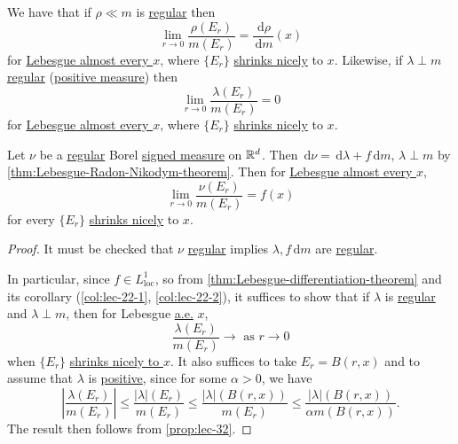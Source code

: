 \begin{prev}
	We have that if \(\rho \ll m\) is \hyperref[def:regular]{regular} then
	\[
		\lim_{r \to 0} \frac{\rho(E_r)}{m(E_r)} = \frac{\,\mathrm{d}\rho}{\,\mathrm{d}m}(x)
	\]
	for \hyperref[def:mu-almost-everywhere]{Lebesgue almost every \(x\)}, where \(\{E_r\}\) \hyperref[def:shrink-nicely]{shrinks nicely} to \(x\).
	Likewise, if \(\lambda \perp m\) \hyperref[def:regular]{regular} (\hyperref[def:signed-measure]{positive measure}) then
	\[
		\lim_{r \to 0} \frac{\lambda(E_r)}{m(E_r)} = 0
	\]
	for \hyperref[def:mu-almost-everywhere]{Lebesgue almost every \(x\)}, where \(\{E_r\}\) \hyperref[def:shrink-nicely]{shrinks nicely} to \(x\).
\end{prev}
\begin{theorem}\label{thm:Lebesgue-differentiation-theorem-for-regular-measure}
	Let \(\nu\) be a \hyperref[def:regular]{regular} Borel \hyperref[def:signed-measure]{signed measure} on \(\mathbb{\MakeUppercase{r}} ^d\).
	Then \(\,\mathrm{d}\nu = \,\mathrm{d}\lambda + f \,\mathrm{d}m\), \(\lambda \perp m\) by \autoref{thm:Lebesgue-Radon-Nikodym-theorem}.
	Then for \hyperref[def:mu-almost-everywhere]{Lebesgue almost every \(x\)},
	\[
		\lim_{r \to 0} \frac{\nu(E_r)}{m(E_r)} = f(x)
	\]
	for every \(\{E_r\}\) \hyperref[def:shrink-nicely]{shrinks nicely} to \(x\).
\end{theorem}
\begin{proof}
	It must be checked that \(\nu\) \hyperref[def:regular]{regular} implies \(\lambda, f \,\mathrm{d}m\) are \hyperref[def:regular]{regular}.

	In particular, since \(f\in L^1_{\mathrm{loc} } \), so from \autoref{thm:Lebesgue-differentiation-theorem} and its corollary (\autoref{col:lec-22-1}, \autoref{col:lec-22-2}),
	it suffices to show that if \(\lambda \) is \hyperref[def:regular]{regular} and \(\lambda \perp m\), then for Lebesgue \hyperref[def:mu-almost-everywhere]{a.e.} \(x\),
	\[
		\frac{\lambda (E_{r} )}{m(E_{r} )}\to \text{ as }r\to 0
	\]
	when \(\{E_{r} \}\) \hyperref[def:shrink-nicely]{shrinks nicely to \(x\)}. It also suffices to take \(E_{r} = B(r, x)\) and to assume that \(\lambda \) is
	\hyperref[def:signed-measure]{positive}, since for some \(\alpha >0\), we have
	\[
		\left\vert \frac{\lambda (E_{r} )}{m(E_{r} )} \right\vert
		\leq \frac{\left\vert \lambda \right\vert(E_{r} ) }{m(E_{r} )}
		\leq \frac{\left\vert \lambda \right\vert(B(r, x)) }{m(E_{r} )}
		\leq \frac{\left\vert \lambda \right\vert(B(r, x)) }{\alpha m(B(r, x))}.
	\]
	The result then follows from \autoref{prop:lec-32}.
\end{proof}

